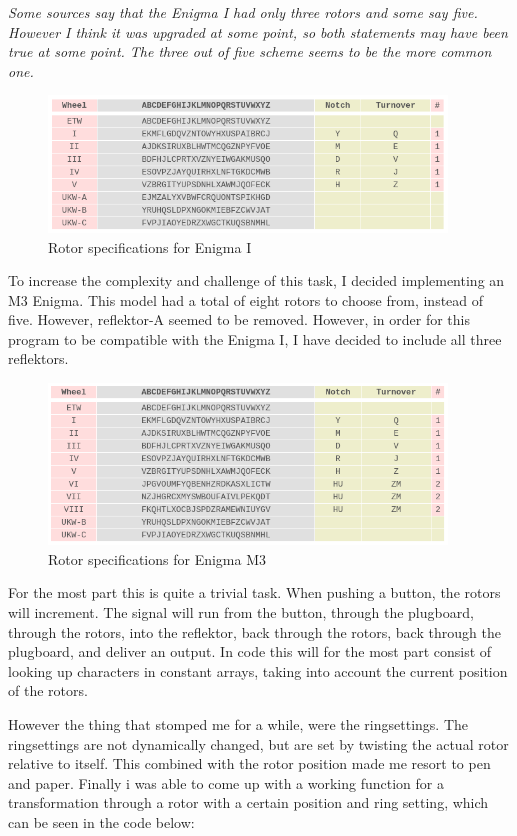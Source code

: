 \documentclass{article}
\begin{document}
\textit{Some sources say that the Enigma I had only three rotors and some say five. However I think it was upgraded at some point, so both statements may have been true at some point. The three out of five scheme seems to be the more common one.}

\begin{figure}[H]
 \centering
  \includegraphics[width=300pt]{img/enigmaIspecs.png}
 \caption{Rotor specifications for Enigma I \cite{ENIGMA2}}
 \end{figure}

To increase the complexity and challenge of this task, I decided implementing an M3 Enigma. This model had a total of eight rotors to choose from, instead of five. However, reflektor-A seemed to be removed. However, in order for this program to be compatible with the Enigma I, I have decided to include all three reflektors. 

\begin{figure}[H]
 \centering
  \includegraphics[width=300pt]{img/enigmaM3specs.png}
 \caption{Rotor specifications for Enigma M3 \cite{ENIGMA2}}
 \end{figure}

For the most part this is quite a trivial task. When pushing a button, the rotors will increment. The signal will run from the button, through the plugboard, through the rotors, into the reflektor, back through the rotors, back through the plugboard, and deliver an output. In code this will for the most part consist of looking up characters in constant arrays, taking into account the current position of the rotors. 

However the thing that stomped me for a while, were the ringsettings. The ringsettings are not dynamically changed, but are set by twisting the actual rotor relative to itself. This combined with the rotor position made me resort to pen and paper. Finally i was able to come up with a working function for a transformation through a rotor with a certain position and ring setting, which can be seen in the code below:
\end{document}
